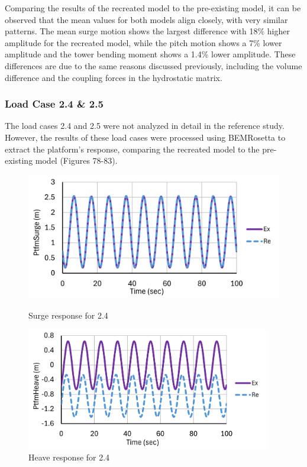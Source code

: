 \documentclass[a4paper, 11pt]{article}
\begin{document}
Comparing the results of the recreated model to the pre-existing model, it can be observed that the mean values for both models align closely, with very similar patterns. The mean surge motion shows the largest difference with 18\% higher amplitude for the recreated model, while the pitch motion shows a 7\% lower amplitude and the tower bending moment shows a 1.4\% lower amplitude. These differences are due to the same reasons discussed previously, including the volume difference and the coupling forces in the hydrostatic matrix.

\subsubsection{Load Case 2.4 \& 2.5}

\hspace*{0.5cm}The load cases 2.4 and 2.5 were not analyzed in detail in the reference study. However, the results of these load cases were processed using BEMRosetta to extract the platform's response, comparing the recreated model to the pre-existing model (Figures 78-83).

\begin{figure}[H]
    \begin{minipage}{0.48\textwidth}
        \centering
        \includegraphics[width=1\textwidth]{2.4_surge_mine.png}
        \caption{\small Surge response for 2.4}
        \label{fig:2.4_surge_mine_recreated}
    \end{minipage}
    \hfill
    \begin{minipage}{0.5\textwidth}
        \centering
        \includegraphics[width=0.95\textwidth]{2.4_heave_mine.png}
        \caption{\small Heave response for 2.4}
        \label{fig:2.4_heave_mine_recreated}
    \end{minipage}
\end{figure}
\end{document}
